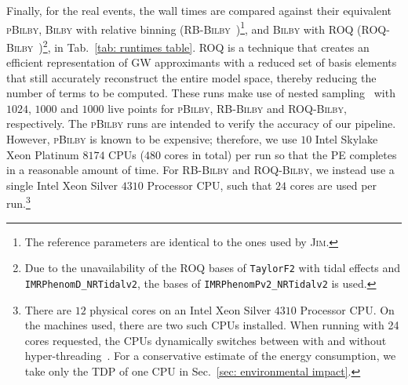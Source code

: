 \documentclass[prd,twocolumn,a4paper,floatfix,nofootinbib,preprintnumbers,superscriptaddress]{revtex4-1}
\begin{document}
Finally, for the real events, the wall times are compared against their equivalent \textsc{pBilby}, \textsc{Bilby} with relative binning (RB-\textsc{Bilby}~\cite{Krishna:2023bug})\footnote{The reference parameters are identical to the ones used by \textsc{Jim}.}, and \textsc{Bilby} with \ac{ROQ} (ROQ-\textsc{Bilby}~\cite{Morisaki:2023kuq})\footnote{Due to the unavailability of the \ac{ROQ} bases of \texttt{TaylorF2} with tidal effects and \texttt{IMRPhenomD\_NRTidalv2}, the bases of \texttt{IMRPhenomPv2\_NRTidalv2} is used.}, in Tab.~\ref{tab: runtimes table}. \ac{ROQ} is a technique that creates an efficient representation of \ac{GW} approximants with a reduced set of basis elements that still accurately reconstruct the entire model space, thereby reducing the number of terms to be computed. These runs make use of nested sampling~\cite{Skilling:2006gxv} with $1024$, $1000$ and $1000$ live points for \textsc{pBilby}, \textsc{RB-Bilby} and \textsc{ROQ-Bilby}, respectively. The \textsc{pBilby} runs are intended to verify the accuracy of our pipeline. However, \textsc{pBilby} is known to be expensive; therefore, we use $10$ Intel Skylake Xeon Platinum $8174$ \acp{CPU} ($480$ cores in total) per run so that the \ac{PE} completes in a reasonable amount of time. For RB-\textsc{Bilby} and ROQ-\textsc{Bilby}, we instead use a single Intel Xeon Silver $4310$ Processor \ac{CPU}, such that $24$ cores are used per run.\footnote{There are $12$ physical cores on an Intel Xeon Silver $4310$ Processor \ac{CPU}. On the machines used, there are two such \acp{CPU} installed. When running with 24 cores requested, the \acp{CPU} dynamically switches between with and without hyper-threading~\cite{intel_cpu_datasheet_4310}. For a conservative estimate of the energy consumption, we take only the \ac{TDP} of one \ac{CPU} in Sec.~\ref{sec: environmental impact}.}
\end{document}
